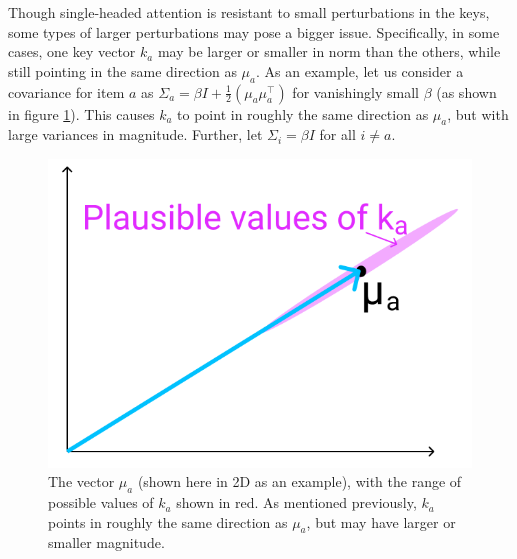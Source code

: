 \begin{parts}
\begin{subparts}

\subpart[3] Though single-headed attention is resistant to small perturbations in the keys, some types of larger perturbations may pose a bigger issue. Specifically, in some cases, one key vector $k_a$ may be larger or smaller in norm than the others, while still pointing in the same direction as $\mu_a$. As an example, let us consider a covariance for item $a$ as $\Sigma_a = \beta I + \frac{1}{2}(\mu_a\mu_a^\top)$ for vanishingly small $\beta$ (as shown in figure \ref{ka_plausible}). This causes $k_a$ to point in roughly the same direction as $\mu_a$, but with large variances in magnitude. Further, let $\Sigma_i = \beta I$ for all $i \neq a$.
\begin{figure}[h]
\centering
\captionsetup{justification=centering,margin=2cm}
\includegraphics[width=0.35\linewidth]{images/ka_plausible.png}
\caption{The vector $\mu_a$ (shown here in 2D as an example), with the range of possible values of $k_a$ shown in red. As mentioned previously, $k_a$ points in roughly the same direction as $\mu_a$, but may have larger or smaller magnitude.}
\label{ka_plausible}
\end{figure}


\end{subparts}
\end{parts}
